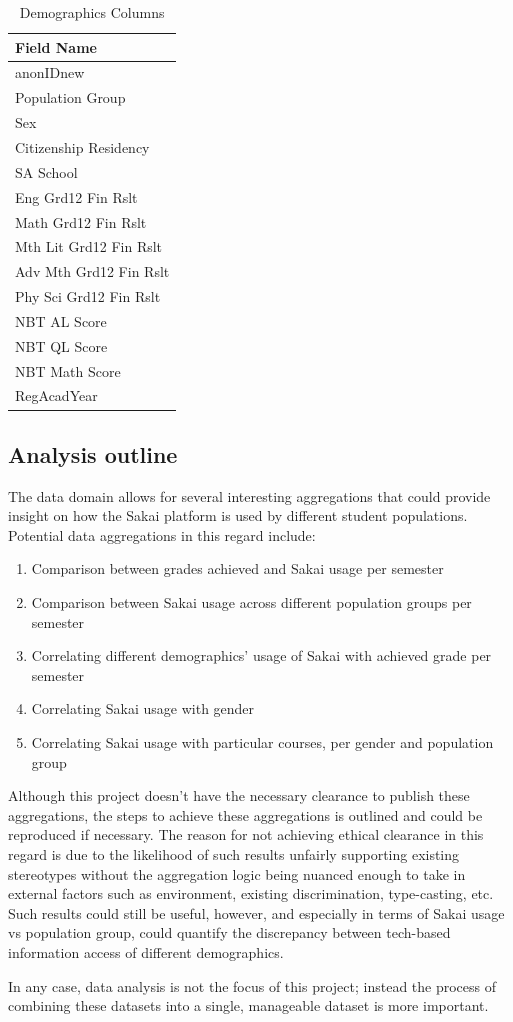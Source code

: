 \begin{table}[]
  \centering
  \caption{Demographics Columns}
  \label{Demographics Columns}
  \begin{tabular}{l}
    Field Name             \\ \hline
    anonIDnew              \\
    Population Group       \\
    Sex                    \\
    Citizenship Residency  \\
    SA School              \\
    Eng Grd12 Fin Rslt     \\
    Math Grd12 Fin Rslt    \\
    Mth Lit Grd12 Fin Rslt \\
    Adv Mth Grd12 Fin Rslt \\
    Phy Sci Grd12 Fin Rslt \\
    NBT AL Score           \\
    NBT QL Score           \\
    NBT Math Score         \\
    RegAcadYear            \\ \hline
  \end{tabular}
\end{table}

\subsection{Analysis outline}
The data domain allows for several interesting aggregations that could provide insight on how the Sakai platform is used by different student populations. Potential data aggregations in this regard include:

\begin{enumerate}
  \item Comparison between grades achieved and Sakai usage per semester
  \item Comparison between Sakai usage across different population groups per semester
  \item Correlating different demographics' usage of Sakai with achieved grade per semester
  \item Correlating Sakai usage with gender
  \item Correlating Sakai usage with particular courses, per gender and population group
\end{enumerate}

Although this project doesn't have the necessary clearance to publish these aggregations, the steps to achieve these aggregations is outlined and could be reproduced if necessary. The reason for not achieving ethical clearance in this regard is due to the likelihood of such results unfairly supporting existing stereotypes without the aggregation logic being nuanced enough to take in external factors such as environment, existing discrimination, type-casting, etc. Such results could still be useful, however, and especially in terms of Sakai usage vs population group, could quantify the discrepancy between tech-based information access of different demographics.

In any case, data analysis is not the focus of this project; instead the process of combining these datasets into a single, manageable dataset is more important.